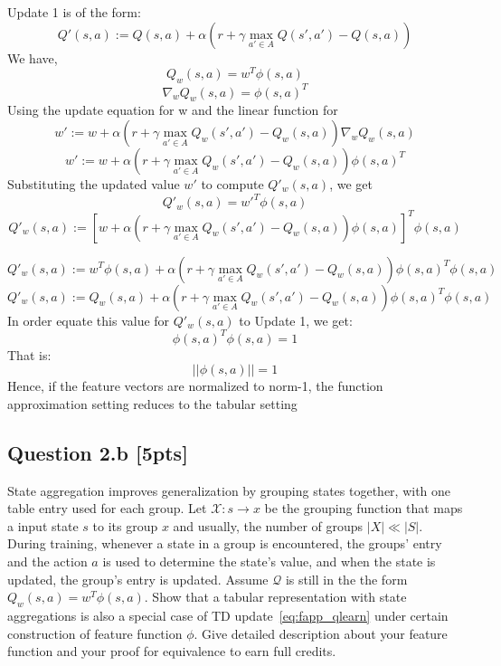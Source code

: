 \documentclass[12pt]{article}
\begin{document}
\noindent
\begin{solution}
Update 1 is of the form:
	$$Q'(s, a) := Q(s, a) + 
		\alpha \left( 
			r + \gamma \max _{a' \in A} Q(s', a') 
				- Q(s, a) 
		\right)$$
We have,
$$Q_{w}(s, a) = w^T \phi(s, a)$$
$$\nabla _w Q_w (s, a)  = \phi(s, a)^T $$
Using the update equation for w and the linear function for 
	$$w' := w + 
		\alpha \left( 
			r + \gamma \max _{a' \in A} Q _w(s', a') 
				- Q _w(s, a) 
		\right) \nabla _w 
			Q _w (s, a)$$
	$$w' := w + 
		\alpha \left( 
			r + \gamma \max _{a' \in A} Q _w(s', a') 
				- Q _w(s, a) 
		\right)\phi(s, a)^T $$
Substituting the updated value $w'$ to compute $Q'_{w}(s, a)$, we get
$$Q'_{w}(s, a) = w'^T\phi(s, a)$$
	$$Q'_{w}(s, a) := \left[w + 
		\alpha \left( 
			r + \gamma \max _{a' \in A} Q _w(s', a') 
				- Q _w(s, a) 
		\right)\phi(s, a)\right]^T\phi(s, a)$$

	$$Q'_{w}(s, a) := w^T\phi(s, a) + 
		\alpha \left( 
			r + \gamma \max _{a' \in A} Q _w(s', a') 
				- Q _w(s, a) 
		\right)\phi(s, a)^T\phi(s, a)$$
	$$Q'_{w}(s, a) := Q_{w}(s, a) + 
		\alpha \left( 
			r + \gamma \max _{a' \in A} Q _w(s', a') 
				- Q _w(s, a) 
		\right)\phi(s, a)^T\phi(s, a)$$
In order equate this value for $Q'_{w}(s, a)$ to Update 1, we get:
$$\phi(s, a)^T\phi(s, a) = 1$$
That is:
$$||\phi(s, a)|| = 1$$
Hence, if the feature vectors are normalized to norm-1, the function approximation setting reduces to the tabular setting
\end{solution}

\pagebreak[4]

\subsection*{Question 2.b \textbf{[5pts]}}
State aggregation improves generalization by grouping states together, with one table entry used for each group. Let $\mathcal{X}: s \to x$ be the grouping function that maps a input state $s$ to its group $x$ and usually, the number of groups $|X| \ll |S|$. During training, whenever a state in a group is encountered, the groups' entry and the action $a$ is used to determine the state's value, and when the state is updated, the group's entry is updated. Assume $\mathcal Q$ is still in the the form $Q _w(s, a) = w ^T \phi(s, a)$. Show that a tabular representation with state aggregations is also a special case of TD update~\ref{eq:fapp_qlearn} under certain construction of feature function $\phi$. Give detailed description about your feature function and your proof for equivalence to earn full credits.
\end{document}
